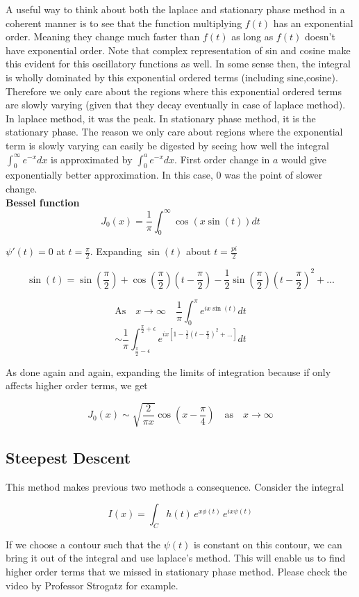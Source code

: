 \documentclass{report}
\begin{document}
\noindent A useful way to think about both the laplace and stationary phase method in a coherent manner is to see that the function multiplying $f(t)$ has an exponential order. Meaning they change much faster than $f(t)$ as long as $f(t)$ doesn't have exponential order. Note that complex representation of sin and cosine make this evident for this oscillatory functions as well. In some sense then, the integral is wholly dominated by this exponential ordered terms (including sine,cosine). Therefore we only care about the regions where this exponential ordered terms are slowly varying (given that they decay eventually in case of laplace method). In laplace method, it was the peak. In stationary phase method, it is the stationary phase. The reason we only care about regions where the exponential term is slowly varying can easily be digested by seeing how well the integral $\int_{0}^{\infty}e^{-x}dx$ is approximated by $\int_{0}^{a}e^{-x}dx$. First order change in $a$ would give exponentially better approximation. In this case, $0$ was the point of slower change.\\

\noindent \textbf{Bessel function}\\

$$J_0(x) = \frac{1}{\pi}\int_{0}^{\infty}\cos(x\sin(t)) dt$$

\noindent $\psi'(t) = 0$ at $t=\frac{\pi}{2}$. Expanding $\sin(t)$ about $t=\frac{pi}{2}$

$$\sin\left(t\right) = \sin\left(\frac{\pi}{2}\right) + \cos\left(\frac{\pi}{2}\right)\left(t-\frac{\pi}{2}\right) -\frac{1}{2}\sin\left(\frac{\pi}{2}\right)\left(t-\frac{\pi}{2}\right)^2 + ...$$

$$\mathrm{As}\quad x\to\infty\quad \frac{1}{\pi}\int_{0}^{\pi}e^{ix\sin(t)}dt$$
$$\sim \frac{1}{\pi}\int_{\frac{\pi}{2}-\epsilon}^{\frac{\pi}{2}+\epsilon}e^{ix\left[1-\frac{1}{2}\left(t-\frac{\pi}{2}\right)^2 +...\right]}dt$$

\noindent As done again and again, expanding the limits of integration because if only affects higher order terms, we get 

$$J_0\left(x\right) \sim \sqrt{\frac{2}{\pi x}} \cos\left(x-\frac{\pi}{4}\right) \quad\mathrm{as}\quad x\to\infty$$

\subsection{Steepest Descent}
This method makes previous two methods a consequence. Consider the integral 

$$I(x) = \int_{C}h(t)\, e^{x\phi(t)}\, e^{ix\psi(t)}$$

\noindent If we choose a contour such that the $\psi(t)$ is constant on this contour, we can bring it out of the integral and use laplace's method. This will enable us to find higher order terms that we missed in stationary phase method. Please check the video by Professor Strogatz for example.\\
\end{document}
